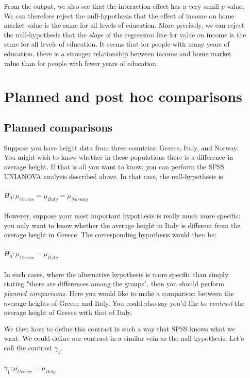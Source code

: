 \documentclass[]{book}\usepackage[]{graphicx}\usepackage[]{color}
\begin{document}
From the output, we also see that the interaction effect has a very small $p$-value. We can therefore reject the null-hypothesis that the effect of income on home market value is the same for all levels of education. More precisely, we can reject the null-hypothesis that the \textit{slope} of the regression line for value on income is the same for all levels of education. It seems that for people with many years of education, there is a stronger relationship between income and home market value than for people with fewer years of education. 



\chapter{Planned and post hoc comparisons}\label{chap:advanced}


\section{Planned comparisons}

Suppose you have height data from three countries: Greece, Italy, and Norway. You might wish to know whether in these populations there is a difference in average height. If that is all you want to know, you can perform the SPSS UNIANOVA analysis described above. In that case, the null-hypothesis is
\\
\\
$H_0: \mu_{Greece}=\mu_{Italy}=\mu_{Norway}$
\\
\\
However, suppose your most important hypothesis is really much more specific: you only want to know whether the average height in Italy is different from the average height in Greece. The corresponding hypothesis would then be: 
\\
\\
$H_0: \mu_{Greece}=\mu_{Italy}$
\\
\\
In such cases, where the alternative hypothesis is more specific than simply stating "there are differences among the groups", then you should perform \textit{planned comparisons}. Here you would like to make a comparison between the average heights of Greece and Italy. You could also say you'd like to \textit{contrast} the average height of Greece with that of Italy. 

We then have to define this contrast in such a way that SPSS knows what we want. We could define our contrast in a similar vein as the null-hypothesis. Let's call the contrast $\gamma_1$.
\\
\\
$\gamma_1: \mu_{Greece}=\mu_{Italy}$
\\
\\
\end{document}
